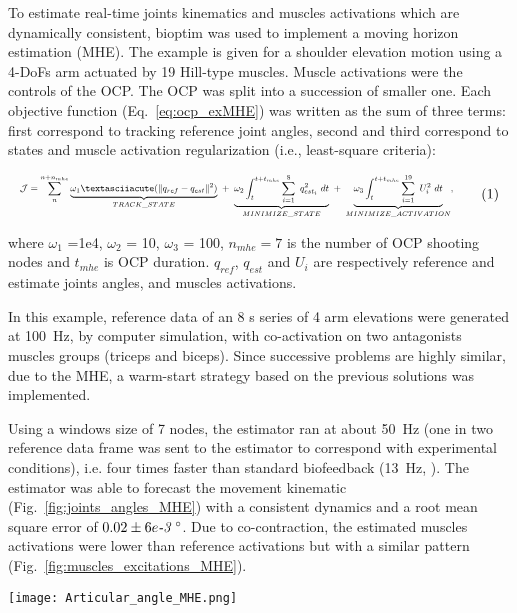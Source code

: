 To estimate real-time joints kinematics and muscles activations which are dynamically consistent, bioptim was used to implement a moving horizon estimation (MHE). 
The example is given for a shoulder elevation motion using a 4-DoFs arm actuated by 19 Hill-type muscles.
Muscle activations were the controls of the OCP.
The OCP was split into a succession of smaller one. Each objective function (Eq.~\ref{eq:ocp_exMHE}) was written as the sum of three terms: first correspond to tracking reference joint angles, second and third correspond to states and muscle activation regularization (i.e., least-square criteria): 

\[ 
\resizebox{0.9\columnwidth}{!}{$ 
\begin{aligned}
\mathcal{J} = \sum_{n}^{n + n_{mhe}}\underbrace{\omega_1´(\|q_{ref} - q_{est}\|^{2})}_{TRACK\_STATE} ~  
+ ~ \underbrace{\omega_2\int_t^{t+t_{mhe}} \sum_{i=1}^{8}~ q_{est_i}^2~dt}_{MINIMIZE\_ STATE} ~  
+ ~ \underbrace{\omega_3\int_t^{t+t_{mhe}} \sum_{i=1}^{19}~U_{i}^2~dt}_{MINIMIZE\_ ACTIVATION}, 
\end{aligned}  
$}  
\addtag  
\label{eq:ocp_exMHE}  
\]  

\noindent where $\omega_1$ =1e4, $\omega_2$ = 10, $\omega_3$ = 100, $n_{mhe}=7$ is the number of OCP shooting nodes and $t_{mhe}$ is OCP duration. $q_{ref}$, $q_{est}$ and $U_i$ are respectively reference and estimate joints angles, and muscles activations. 

In this example, reference data of an 8 s series of 4 arm elevations were generated at 100~Hz, by computer simulation, with co-activation on two antagonists muscles groups (triceps and biceps).
Since successive problems are highly similar, due to the MHE, a warm-start strategy based on the previous solutions was implemented.

Using a windows size of 7 nodes, the estimator ran at about 50~Hz (one in two reference data frame was sent to the estimator to correspond with experimental conditions), i.e. four times faster than standard biofeedback (13~Hz, \cite{kannape2013biofeedback}).
The estimator was able to forecast the movement kinematic (Fig.~\ref{fig:joints_angles_MHE}) with a consistent dynamics and a root mean square error of $0.02\pm6e\emph{-3}\text{~}^{\circ}$.
Due to co-contraction, the estimated muscles activations were lower than reference activations but with a similar pattern (Fig.~\ref{fig:muscles_excitations_MHE}).  

 

\begin{figure*}[t!] 
\centering 
\texttt{[image: Articular\_angle\_MHE.png]}\\ 
\caption{Time histories of estimate joints angles (blue cross) and reference joints angles (orange line).} 
\label{fig:joints_angles_MHE} 
\end{figure*} 


